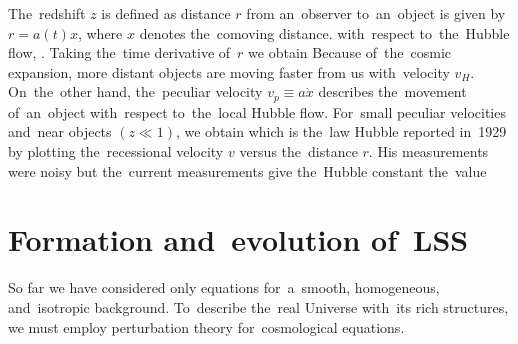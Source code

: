 The~redshift $z$ is defined as
\DIFdelbegin {}\DIFdelend \DIFaddbegin {}\DIFaddend distance $r$ from an~observer \DIFdelbegin {}\DIFdelend to~an~object \DIFaddbegin {}\DIFaddend is given by $r=a(t)x$, where $x$ denotes the~comoving distance. \DIFdelbegin {}\DIFdelend \DIFaddbegin {}\DIFaddend with~respect to~the~Hubble flow, \DIFdelbegin {}\DIFdelend \DIFaddbegin {}\DIFaddend . Taking the~time derivative of~$r$ we obtain
Because of~the~cosmic expansion, more distant objects are moving faster from us with~velocity $v_H$. On~the~other hand, the~peculiar velocity $v_p\equiv a\dot x$ describes the~movement of~an~object with~respect to~the~local Hubble flow. For~small peculiar velocities and~near objects $(z\ll1)$, we obtain
which is the~law Hubble reported in~1929 by plotting the~recessional velocity $v$ versus the~distance $r$. His measurements were noisy but the~current measurements give the~Hubble constant the~value \parencite{planck_cosm}
\section{Formation and~evolution of~LSS}
So far we have considered only equations for~a~smooth, homogeneous, and~isotropic background. To~describe the~real Universe with~its rich structures, we must employ perturbation theory for~cosmological equations.

